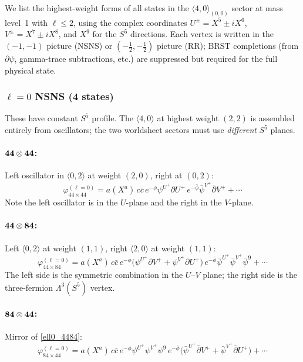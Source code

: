 \documentclass[12pt]{article}
\def\be{\begin{equation}}
\def\ee{\end{equation}}
\begin{document}
We list the highest-weight forms of all states in the $\langle 4,0\rangle_{(0,0)}$
sector at mass level~1 with $\ell\leq 2$, using the complex coordinates
$U^\pm=X^5\pm iX^6$, $V^\pm=X^7\pm iX^8$, and $X^9$ for the $S^5$ directions.
Each vertex is written in the $(-1,-1)$ picture (NSNS) or $(-\tfrac12,-\tfrac12)$
picture (RR); BRST completions (from $\partial\psi$, gamma-trace subtractions, etc.)
are suppressed but required for the full physical state.

\subsubsection*{$\ell=0$ NSNS (4 states)}

These have constant $S^5$ profile. The $\langle 4,0\rangle$ at highest weight $(2,2)$
is assembled entirely from oscillators; the two worldsheet sectors must use
\emph{different} $S^5$ planes.

\paragraph{${\bf 44}\otimes{\bf 44}$:}
Left oscillator in $\langle 0,2\rangle$ at weight $(2,0)$, right at $(0,2)$:
\be\label{ell0_4444}
\varphi^{(\ell=0)}_{44\times 44}
= a(X^a)\, c\bar c\,
e^{-\phi}\psi^{U^+}\partial U^+\,
e^{-\bar\phi}\bar\psi^{V^+}\bar\partial V^+
+\cdots
\ee
Note the left oscillator is in the $U$-plane and the right in the $V$-plane.

\paragraph{${\bf 44}\otimes{\bf 84}$:}
Left $\langle 0,2\rangle$ at weight $(1,1)$, right $\langle 2,0\rangle$ at weight $(1,1)$:
\be\label{ell0_4484}
\varphi^{(\ell=0)}_{44\times 84}
= a(X^a)\, c\bar c\,
e^{-\phi}\big(\psi^{U^+}\partial V^++\psi^{V^+}\partial U^+\big)\,
e^{-\bar\phi}\bar\psi^{U^+}\bar\psi^{V^+}\bar\psi^9
+\cdots
\ee
The left side is the symmetric combination in the $U$--$V$ plane;
the right side is the three-fermion $\Lambda^3(S^5)$ vertex.

\paragraph{${\bf 84}\otimes{\bf 44}$:}
Mirror of \eqref{ell0_4484}:
\be\label{ell0_8444}
\varphi^{(\ell=0)}_{84\times 44}
= a(X^a)\, c\bar c\,
e^{-\phi}\psi^{U^+}\psi^{V^+}\psi^9\,
e^{-\bar\phi}\big(\bar\psi^{U^+}\bar\partial V^++\bar\psi^{V^+}\bar\partial U^+\big)
+\cdots
\ee
\end{document}
